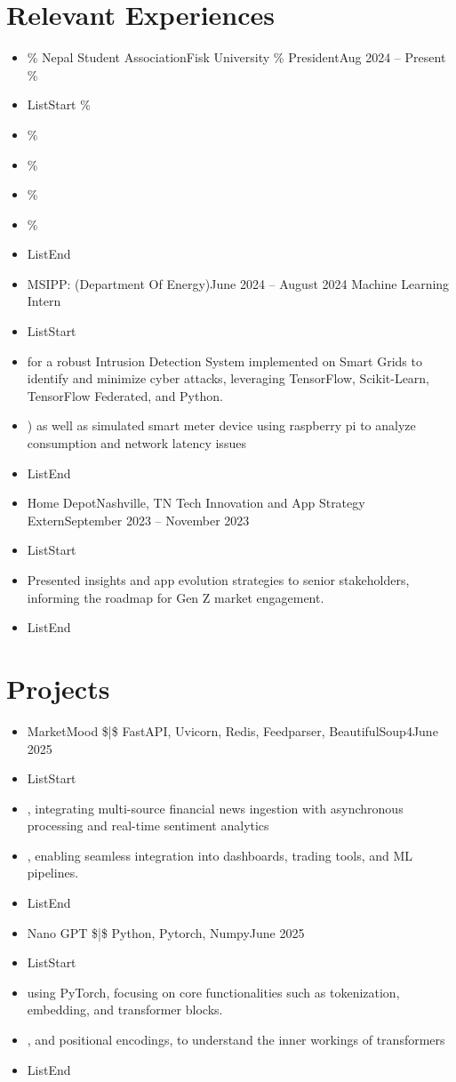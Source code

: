 \documentclass[12pt]{article} %
\begin{document}
\section{Relevant Experiences}
\begin{itemize}
  \item \%     Nepal Student AssociationFisk University
  \%     PresidentAug 2024 -- Present
  \%
  \item ListStart
  \%
  \item \%
  \item \%
  \item \%
  \item \%
  \item ListEnd
  \item MSIPP: (Department Of Energy)June 2024 – August 2024
      Machine Learning Intern
  \item ListStart
  \item for a robust Intrusion Detection System implemented on Smart Grids to identify and minimize cyber attacks, leveraging TensorFlow, Scikit-Learn, TensorFlow Federated, and Python.
  \item )  as well as simulated smart meter device using raspberry pi to analyze consumption and network latency issues
  \item ListEnd
  \item Home DepotNashville, TN
    Tech Innovation and App Strategy ExternSeptember 2023 -- November 2023
  \item ListStart
  \item Presented insights and app evolution strategies to senior stakeholders, informing the roadmap for Gen Z market engagement.
  \item ListEnd
\end{itemize}
\section{Projects}
\begin{itemize}
  \item MarketMood \$|\$ FastAPI, Uvicorn, Redis, Feedparser, BeautifulSoup4June 2025
  \item ListStart
  \item , integrating multi-source financial news ingestion  with asynchronous processing and real-time sentiment analytics
  \item , enabling seamless integration into dashboards, trading tools, and ML pipelines.
  \item ListEnd
  \item Nano GPT \$|\$ Python, Pytorch, NumpyJune 2025
  \item ListStart
  \item using PyTorch, focusing on core functionalities such as tokenization, embedding, and transformer blocks.
  \item , and positional encodings, to understand the inner workings of transformers
  \item ListEnd
\end{itemize}
\end{document}

